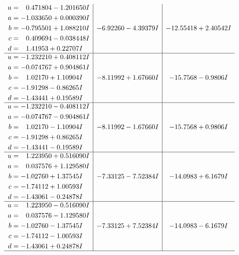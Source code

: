 \documentclass[1p]{elsarticle_modified}
\theoremstyle{definition}
\begin{document}
$$\begin{array}{c|c|c}
\begin{aligned}
u &= \phantom{-}0.471804 - 1.201650 I \\
a &= -1.033650 + 0.000390 I \\
b &= -0.795501 + 1.088210 I \\
c &= \phantom{-}0.409694 - 0.038448 I \\
d &= \phantom{-}1.41953 + 0.22707 I\end{aligned}
 & -6.92260 - 4.39379 I & -12.55418 + 2.40542 I \\ \hline\begin{aligned}
u &= -1.232210 + 0.408112 I \\
a &= -0.074767 + 0.904861 I \\
b &= \phantom{-}1.02170 + 1.10904 I \\
c &= -1.91298 - 0.86265 I \\
d &= -1.43441 + 0.19589 I\end{aligned}
 & -8.11992 + 1.67660 I & -15.7568 - 0.9806 I \\ \hline\begin{aligned}
u &= -1.232210 - 0.408112 I \\
a &= -0.074767 - 0.904861 I \\
b &= \phantom{-}1.02170 - 1.10904 I \\
c &= -1.91298 + 0.86265 I \\
d &= -1.43441 - 0.19589 I\end{aligned}
 & -8.11992 - 1.67660 I & -15.7568 + 0.9806 I \\ \hline\begin{aligned}
u &= \phantom{-}1.223950 + 0.516090 I \\
a &= \phantom{-}0.037576 + 1.129580 I \\
b &= -1.02760 + 1.37545 I \\
c &= -1.74112 + 1.00593 I \\
d &= -1.43061 - 0.24878 I\end{aligned}
 & -7.33125 - 7.52384 I & -14.0983 + 6.1679 I \\ \hline\begin{aligned}
u &= \phantom{-}1.223950 - 0.516090 I \\
a &= \phantom{-}0.037576 - 1.129580 I \\
b &= -1.02760 - 1.37545 I \\
c &= -1.74112 - 1.00593 I \\
d &= -1.43061 + 0.24878 I\end{aligned}
 & -7.33125 + 7.52384 I & -14.0983 - 6.1679 I\\
 \hline 
 \end{array}$$\newpage$$\begin{array}{c|c|c}  

\end{array}$$
\end{document}
